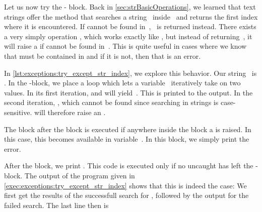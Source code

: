 %
Let us now try the - block.
Back in \cref{sec:strBasicOperations}, we learned that text strings offer the method  that searches a string~ inside~ and returns the first index where it is encountered.
If  cannot be found in~, ~is returned instead.
There exists a very simply operation , which works exactly like , but instead of returning~, it will raise a  if  cannot be found in~.
This is quite useful in cases where we know that  must be contained in  and if it is not, then that is an error.

In \cref{lst:exceptions:try_except_str_index}, we explore this behavior.
Our string~ is .
In the -block, we place a  loop which lets a variable~ iteratively take on two values.
In its first iteration,  and  will yield~.
This is printed to the output.
In the second iteration, , which cannot be found since searching in strings is case-sensitive.
 will therefore raise an .

The  block after the  block is executed if anywhere inside the  block a  is raised.
In this case, this  becomes available in variable~.
In this block, we simply print the error.

After the block, we print .
This code is executed only if no uncaught  has left the - block.
The output of the program given in \cref{exec:exceptions:try_except_str_index} shows that this is indeed the case:
We first get the results of the successfull search for , followed by the output for the failed search.
The last line then is 

